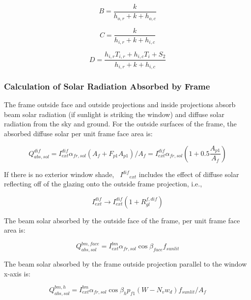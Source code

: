 \begin{equation}
B = \frac{k}{{{h_{o,r}} + k + {h_{o,c}}}}
\end{equation}

\begin{equation}
C = \frac{k}{{{h_{i,r}} + k + {h_{i,c}}}}
\end{equation}

\begin{equation}
D = \frac{{{h_{i,r}}{T_{i,r}} + {h_{i,c}}{T_i} + {S_2}}}{{{h_{i,r}} + k + {h_{i,c}}}}
\end{equation}

\subsubsection{Calculation of Solar Radiation Absorbed by Frame}\label{calculation-of-solar-radiation-absorbed-by-frame}

The frame outside face and outside projections and inside projections absorb beam solar radiation (if sunlight is striking the window) and diffuse solar radiation from the sky and ground. For the outside surfaces of the frame, the absorbed diffuse solar per unit frame face area is:

\begin{equation}
Q_{abs,sol}^{dif} = I_{ext}^{dif}{\alpha_{fr,sol}}\left( {{A_f} + {F_{p1}}{A_{p1}}} \right)/{A_f} = I_{ext}^{dif}{\alpha_{fr,sol}}\left( {1 + 0.5\frac{{{A_{p1}}}}{{{A_f}}}} \right)
\end{equation}

If there is no exterior window shade, \emph{~I\(^{dif}\)\(_{ext}\)} includes the effect of diffuse solar reflecting off of the glazing onto the outside frame projection, i.e.,

\begin{equation}
I_{ext}^{dif} \to I_{ext}^{dif}\left( {1 + R_{gl}^{f,dif}} \right)
\end{equation}

The beam solar absorbed by the outside face of the frame, per unit frame face area is:

\begin{equation}
Q_{abs,sol}^{bm,face} = I_{ext}^{bm}{\alpha_{fr,sol}}\cos {\beta_{face}}{f_{sunlit}}
\end{equation}

The beam solar absorbed by the frame outside projection parallel to the window x-axis is:

\begin{equation}
Q_{abs,sol}^{bm,h} = I_{ext}^{bm}{\alpha_{fr,sol}}\cos {\beta_h}{p_{f1}}\left( {W - {N_v}{w_d}} \right){f_{sunlit}}/{A_f}
\end{equation}


